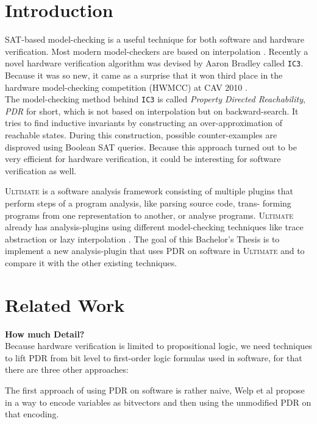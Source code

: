 \documentclass[11pt, a4paper, BCOR=10mm, ngerman, oneside]{scrbook}
\begin{document}
\chapter{Introduction}
SAT-based model-checking is a useful technique for both software and hardware verification. Most modern model-checkers are based on interpolation \cite{Zitat00}. 
Recently a novel hardware verification algorithm was devised by Aaron Bradley \cite{Zitat01} called \texttt{IC3}.
Because it was so new, it came as a surprise that it won third place in the hardware
model-checking competition (HWMCC) at CAV 2010 \cite{cav}. \\ The model-checking method behind \texttt{IC3} is called \textsl{Property Directed Reachability}, \textsl{PDR} for short, which is not based on interpolation but on backward-search. It tries to find inductive invariants by constructing an over-approximation of reachable states. During this construction, possible counter-examples are disproved using Boolean SAT queries. Because this approach turned out to be very efficient for hardware verification, it could be interesting for software verification as well. \\ \par
\textsc{Ultimate} \cite{Zitat02} is a software analysis framework consisting of multiple plugins that perform steps of a program analysis, like parsing source code, trans-
forming programs from one representation to another, or analyse programs.
 \textsc{Ultimate} already has analysis-plugins using different model-checking techniques like trace abstraction \cite{Zitat06} or lazy interpolation \cite{Zitat07}.
The goal of this Bachelor's Thesis is to implement a new analysis-plugin that uses PDR on software in \textsc{Ultimate} and to compare it with the other existing techniques.


\chapter{Related Work}
\textbf{How much Detail?} \\
Because hardware verification is limited to propositional logic, we need techniques to lift PDR from bit level to first-order logic formulas used in software, for that there are three other approaches: \par

The first approach of using PDR on software is rather naive, Welp et al propose in \cite{Welp} a way to encode variables as bitvectors and then using the unmodified PDR on that encoding. 
\end{document}
